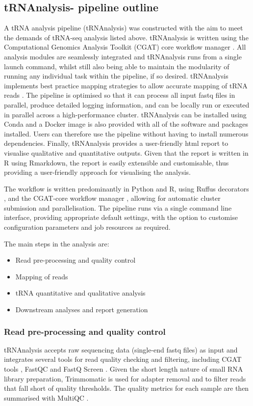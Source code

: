 \subsection{tRNAnalysis- pipeline outline}
A tRNA analysis pipeline (tRNAnalysis) was constructed with the aim to meet the demands of tRNA-seq analysis listed above.
tRNAnalysis is written using the Computational Genomics Analysis Toolkit (CGAT) core workflow manager \cite{cribbs2019cgat}.
All analysis modules are seamlessly integrated and tRNAnalysis runs from a single launch command, whilst still also being able to maintain the modularity of running any individual task within the pipeline, if so desired.
tRNAnalysis implements best practice mapping strategies to allow accurate mapping of tRNA reads \cite{hoffmann2018accurate}.
The pipeline is optimised so that it can process all input fastq files in parallel, produce detailed logging information, and can be locally run or executed in parallel across a high-performance cluster.
tRNAnalysis can be installed using Conda and a Docker image is also provided with all of the software and packages installed.
Users can therefore use the pipeline without having to install numerous dependencies.
Finally, tRNAnalysis provides a user-friendly html report to visualise qualitative and quantitative outputs.
Given that the report is written in R using Rmarkdown, the report is easily extensible and customisable, thus providing a user-friendly approach for visualising the analysis.

The workflow is written predominantly in Python and R, using Ruffus decorators \cite{goodstadt2010ruffus}, and the CGAT-core workflow manager \cite{cribbs2019cgat}, allowing for automatic cluster submission and parallelisation.
The pipeline runs via a single command line interface, providing appropriate default settings, with the option to customise configuration parameters and job resources as required.

The main steps in the analysis are:
\begin{itemize}
  \item Read pre-processing and quality control
  \item Mapping of reads
  \item tRNA quantitative and qualitative analysis
  \item Downstream analyses and report generation
\end{itemize}

\subsubsection{Read pre-processing and quality control}
tRNAnalysis accepts raw sequencing data (single-end fastq files) as input and integrates several tools for read quality checking and filtering, including CGAT tools \cite{sims2014cgat}, FastQC \cite{andrewfastqc} and FastQ Screen \cite{wingett2018fastq}.
Given the short length nature of small RNA library preparation, Trimmomatic \cite{bolger2014trimmomatic} is used for adapter removal and to filter reads that fall short of quality thresholds.
The quality metrics for each sample are then summarised with MultiQC \cite{ewels2016multiqc}.

